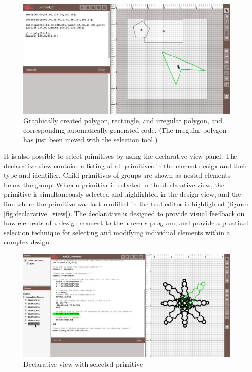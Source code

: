\documentclass{sigchi}
\begin{document}
\begin{center}
\begin{figure}[h!]
\includegraphics[width=\columnwidth]{images/auto_generated_code.jpg}
\caption{Graphically created polygon, rectangle, and irregular polygon, and corresponding automatically-generated code. (The irregular polygon has just been moved with the selection tool.)}
\label{fig:auto_generated_code}
\end{figure}
\end{center}

It is also possible to select primitives by using the declarative view panel. The declarative view contains a listing of all primitives in the current design and their type and identifier. Child primitives of groups are shown as nested elements below the group. When a primitive is selected in the declarative view, the primitive is simultaneously selected and highlighted in the design view, and the line where the primitive was last modified in the text-editor is highlighted (figure:\ref{fig:declarative_view}). The declarative is designed to provide visual feedback on how elements of a design connect to the a user's program, and provide a practical selection technique for selecting and modifying individual elements within a complex design.

\begin{center}
\begin{figure}[h!]
\includegraphics[width=\columnwidth]{images/selection_mechanism.jpg}
\caption{Declarative view with selected primitive}
\label{fig:declarative view}
\end{figure}
\end{center}
\end{document}
